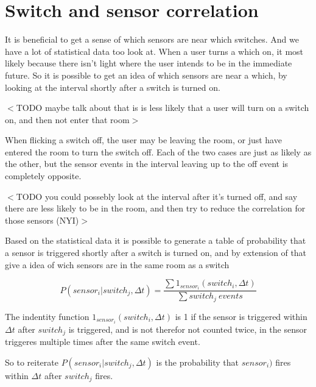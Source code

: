 \section{Switch and sensor correlation}
\label{switchandsensorcorrelation}

It is beneficial to get a sense of which sensors are near which switches. And we have a lot of statistical data too look at. When a user turns a which on, it most likely because there isn't light where the user intends to be in the immediate future. So it is possible to get an idea of which sensors are near a which, by looking at the interval shortly after a switch is turned on.

$<$TODO maybe talk about that is is less likely that a user will turn on a switch on, and then not enter that room$>$

When flicking a switch off, the user may be leaving the room, or just have entered the room to turn the switch off. Each of the two cases are just as likely as the other, but the sensor events in the interval leaving up to the off event is completely opposite. 

$<$TODO you could possebly look at the interval after it's turned off, and say there are less likely to be in the room, and then try to reduce the correlation for those sensors (NYI)$>$

Based on the statistical data it is possible to generate a table of probability that a sensor is triggered shortly after a switch is turned on, and by extension of that give a idea of wich sensors are in the same room as a switch

\[ P(sensor_i | switch_j , \Delta t) = \frac{\sum 1_{sensor_i} (switch_i, \Delta t) }{\sum switch_j \ events } \]

The indentity function $ 1_{sensor_i} (switch_i, \Delta t) $ is 1 if the sensor is triggered within $\Delta t$ after $switch_j$ is triggered, and is not therefor not counted twice, in the sensor triggeres multiple times after the same switch event.

So to reiterate $ P(sensor_i | switch_j , \Delta t) $ is the probability that $sensor_i)$ fires within $\Delta t$ after $switch_j$ fires.

